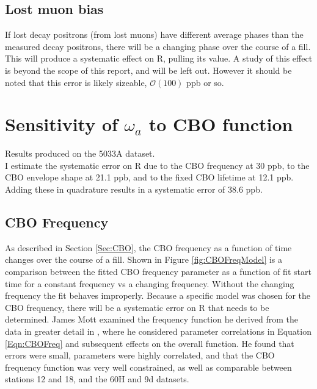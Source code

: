 	\subsection{Lost muon bias}

		If lost decay positrons (from lost muons) have different average \gmtwo phases than the measured decay positrons, there will be a changing \gmtwo phase over the course of a fill. This will produce a systematic effect on R, pulling its value. A study of this effect is beyond the scope of this report, and will be left out. However it should be noted that this error is likely sizeable, $\mathcal{O}(100)$ ppb or so.


\section{Sensitivity of \texorpdfstring{$\omega_{a}$}{} to CBO function}
\label{Sec:SystematicCBO}

	Results produced on the 5033A dataset. \\

	I estimate the systematic error on R due to the CBO frequency at 30 ppb, to the CBO envelope shape at 21.1 ppb, and to the fixed CBO lifetime at 12.1 ppb. Adding these in quadrature results in a systematic error of 38.6 ppb.

	\subsection{CBO Frequency}
	\label{Sec:CBOFreq}

	As described in Section \ref{Sec:CBO}, the CBO frequency as a function of time changes over the course of a fill. Shown in Figure \ref{fig:CBOFreqModel} is a comparison between the fitted CBO frequency parameter as a function of fit start time for a constant frequency vs a changing frequency. Without the changing frequency the fit behaves improperly. Because a specific model was chosen for the CBO frequency, there will be a systematic error on R that needs to be determined. James Mott examined the frequency function he derived from the data in greater detail in , where he considered parameter correlations in Equation \ref{Eqn:CBOFreq} and subsequent effects on the overall function. He found that errors were small, parameters were highly correlated, and that the CBO frequency function was very well constrained, as well as comparable between stations 12 and 18, and the 60H and 9d datasets. 


